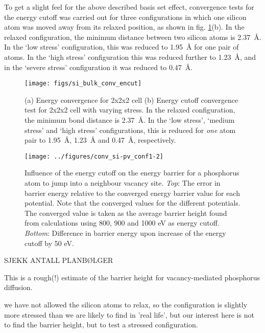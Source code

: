 \documentclass[11pt,bibliography=totoc,index=totoc]{scrbook}   %
\begin{document}
To get a slight feel for the above described basis set effect, convergence tests for the energy cutoff was carried out for 
three configurations in which one silicon atom was moved away from its relaxed position, as shown in fig. \ref{fig:figs/si64_bulk_conv_encut_stress}(b).
In the relaxed configuration, the minimum distance between two silicon atoms is \SI{2.37}{\angstrom}. 
In the `low stress' configuration, this was reduced to \SI{1.95}{\angstrom} for one pair of atoms. 
In the `high stress' configuration this was reduced further to \SI{1.23}{\angstrom}, and in the `severe stress' configuration it was reduced to \SI{0.47}{\angstrom}.

\begin{figure}[htbp]
  \begin{center}
    \texttt{[image: figs/si\_bulk\_conv\_encut]}
  \end{center}
  \caption{
  (a) Energy convergence for 2x2x2 cell
  (b) Energy cutoff convergence test for 2x2x2 cell with varying stress. In the relaxed configuration, the minimum bond distance
  is \SI{2.37}{\angstrom}. In the `low stress', `medium stress' and `high stress' configurations, this is reduced for 
  \emph{one} atom pair to \SI{1.95}{\angstrom}, \SI{1.23}{\angstrom} and \SI{0.47}{\angstrom}, respectively.}
  \label{fig:figs/si64_bulk_conv_encut_stress}
\end{figure}

\begin{figure}[htbp]
  \begin{center}
    \texttt{[image: ../figures/conv\_si-pv\_conf1-2]}
  \end{center}
  \caption{Influence of the energy cutoff on the energy barrier for a phosphorus atom to jump into a neighbour vacancy site. 
  \textit{Top}: The error in barrier energy relative to the converged energy barrier value for each potential. 
  Note that the converged values for the different potentials.
  The converged value is taken as the average barrier height found from calculations using 800, 900 and 1000 eV as energy cutoff.
  \textit{Bottom}: Difference in barrier energy upon increase of the energy cutoff by 50 eV.}
  \label{fig:figs/conv_si-pv_conf1-2}
\end{figure}


SJEKK ANTALL PLANBØLGER

This is a rough(!) estimate of the barrier height for vacancy-mediated phosphorus diffusion.

we have not allowed the silicon atoms to relax, so the configuration is slightly more stressed than 
we are likely to find in 'real life', but our interest here is not to find the barrier height, but 
to test a stressed configuration.
\end{document}
